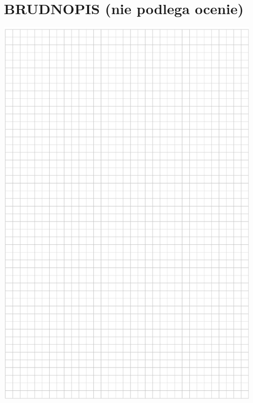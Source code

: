 \documentclass[10pt]{article}
\begin{document}
\section*{BRUDNOPIS (nie podlega ocenie)}
\begin{center}
\includegraphics[max width=\textwidth]{2024_11_21_d51d653f4fe4a5bb0c33g-09}
\end{center}
\end{document}
